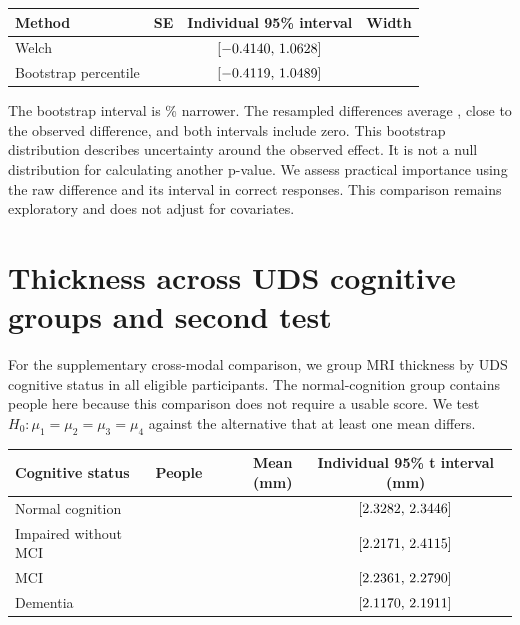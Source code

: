 \documentclass[11pt]{article}
\newcommand{\ci}[2]{\ensuremath{[#1,\,#2]}}
\begin{document}
\begin{center}\small
\begin{tabular}{@{}lccc@{}}
\toprule
Method & SE & Individual 95\% interval & Width \\
\midrule
Welch & \DeltaSE{} & \ci{\DeltaLow}{\DeltaHigh} & \DeltaWidth{} \\
Bootstrap percentile & \DeltaBootSE{} & \ci{\DeltaBootLow}{\DeltaBootHigh} & \DeltaBootWidth{} \\
\bottomrule
\end{tabular}
\end{center}


The bootstrap interval is \DeltaWidthChange\% narrower. The resampled
differences average \DeltaBootMean{}, close to the observed difference,
and both intervals include zero. This bootstrap distribution describes
uncertainty around the observed effect. It is not a null distribution
for calculating another p-value. We assess practical importance using
the raw difference and its interval in correct responses. This comparison
remains exploratory and does not adjust for covariates.

\clearpage
\section{Thickness across UDS cognitive groups and second test}
For the supplementary cross-modal comparison, we group MRI thickness
by UDS cognitive status in all \StatusN{} eligible participants. The
normal-cognition group contains \NormalN{} people here because this
comparison does not require a usable score. We test
$H_0:\mu_1=\mu_2=\mu_3=\mu_4$ against the alternative that at least
one mean differs.

\begin{center}\small
\begin{tabular}{@{}lrrc@{}}
\toprule
Cognitive status & People & Mean (mm) & Individual 95\% t interval (mm) \\
\midrule
Normal cognition & \NormalGroupN{} & \NormalMean{} & \ci{\NormalLow}{\NormalHigh} \\
Impaired without MCI & \ImpairedGroupN{} & \ImpairedMean{} & \ci{\ImpairedLow}{\ImpairedHigh} \\
MCI & \MCIGroupN{} & \MCIMean{} & \ci{\MCILow}{\MCIHigh} \\
Dementia & \DementiaGroupN{} & \DementiaMean{} & \ci{\DementiaLow}{\DementiaHigh} \\
\bottomrule
\end{tabular}
\end{center}
\end{document}
